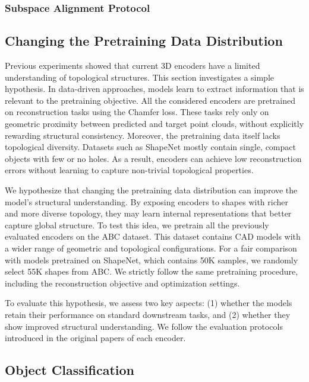 \subsubsection{Subspace Alignment Protocol}
\label{sssec:subspace_alignment_protocol}

\subsection{Changing the Pretraining Data Distribution}
\label{ssec:changing_pretraining_data_distribution}

Previous experiments showed that current 3D encoders have a limited understanding of topological structures. This section investigates a simple hypothesis. In data-driven approaches, models learn to extract information that is relevant to the pretraining objective. All the considered encoders are pretrained on reconstruction tasks using the Chamfer loss. These tasks rely only on geometric proximity between predicted and target point clouds, without explicitly rewarding structural consistency. Moreover, the pretraining data itself lacks topological diversity. Datasets such as ShapeNet mostly contain single, compact objects with few or no holes. As a result, encoders can achieve low reconstruction errors without learning to capture non-trivial topological properties.

We hypothesize that changing the pretraining data distribution can improve the model's structural understanding. By exposing encoders to shapes with richer and more diverse topology, they may learn internal representations that better capture global structure. To test this idea, we pretrain all the previously evaluated encoders on the ABC dataset. This dataset contains CAD models with a wider range of geometric and topological configurations. For a fair comparison with models pretrained on ShapeNet, which contains 50K samples, we randomly select 55K shapes from ABC. We strictly follow the same pretraining procedure, including the reconstruction objective and optimization settings.

To evaluate this hypothesis, we assess two key aspects: (1) whether the models retain their performance on standard downstream tasks, and (2) whether they show improved structural understanding. We follow the evaluation protocols introduced in the original papers of each encoder.

\subsection{Object Classification}

